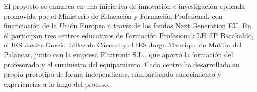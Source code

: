 
El proyecto se enmarca en una iniciativa de innovación e investigación aplicada promovida por el Ministerio
de Educación y Formación Profesional, con financiación de la Unión Europea a través de los fondos Next
Generation EU. En él participan tres centros educativos de Formación Profesional: LH FP Barakaldo, el IES
Javier García Téllez de Cáceres y el IES Jorge Manrique de Motilla del Palancar, junto con la empresa
Fluitronic S.L., que aportó la formación del profesorado y el suministro del equipamiento. Cada centro ha
desarrollado su propio prototipo de forma independiente, compartiendo conocimiento y experiencias a lo
largo del proceso.
